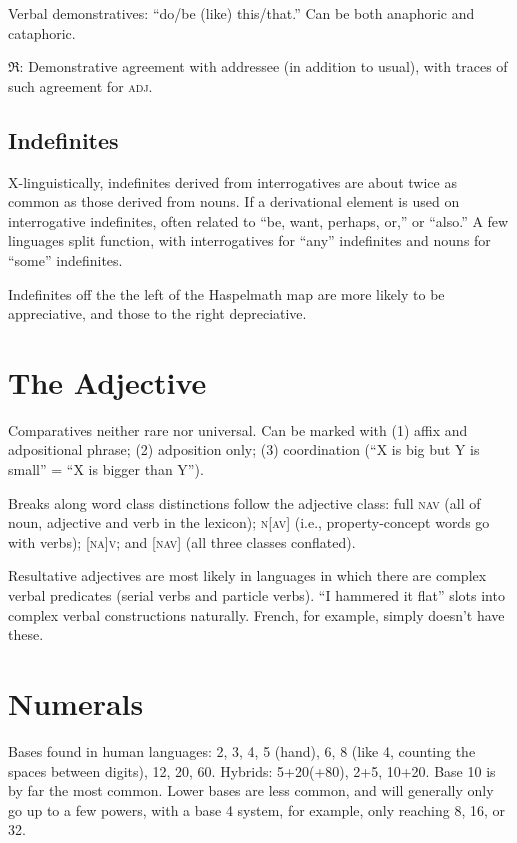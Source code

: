 \documentclass[11pt]{article}
\newcommand{\I}[1]{\textsc{#1}}   %
\newcommand{\rara}[1]{$\mathfrak{R}$: #1}
\begin{document}
Verbal demonstratives: ``do/be (like) this/that.'' Can be both
anaphoric and cataphoric.

\rara{Demonstrative agreement with addressee (in addition to usual),
  with traces of such agreement for \I{adj}.}

\subsection{Indefinites}
X-linguistically, indefinites derived from interrogatives are about
twice as common as those derived from nouns. If a derivational element
is used on interrogative indefinites, often related to ``be, want,
perhaps, or,'' or ``also.'' A few linguages split function, with
interrogatives for ``any'' indefinites and nouns for ``some''
indefinites.

Indefinites off the the left of the Haspelmath map are more likely to
be appreciative, and those to the right depreciative.



\section{The Adjective}
Comparatives neither rare nor universal.  Can be marked with (1) affix
and adpositional phrase; (2) adposition only; (3) coordination (``X is
big but Y is small'' = ``X is bigger than Y'').

Breaks along word class distinctions follow the adjective class: full
\I{nav} (all of noun, adjective and verb in the lexicon); \I{n[av]}
(i.e., property-concept words go with verbs); \I{[na]v}; and \I{[nav]}
(all three classes conflated).

Resultative adjectives are most likely in languages in which there are
complex verbal predicates (serial verbs and particle verbs). ``I
hammered it flat'' slots into complex verbal constructions naturally.
French, for example, simply doesn't have these.


\section{Numerals}
Bases found in human languages: 2, 3, 4, 5 (hand), 6, 8 (like 4,
counting the spaces between digits), 12, 20, 60.  Hybrids: 5+20(+80),
2+5, 10+20.  Base 10 is by far the most common.  Lower bases are less
common, and will generally only go up to a few powers, with a base 4
system, for example, only reaching 8, 16, or 32.
\end{document}
